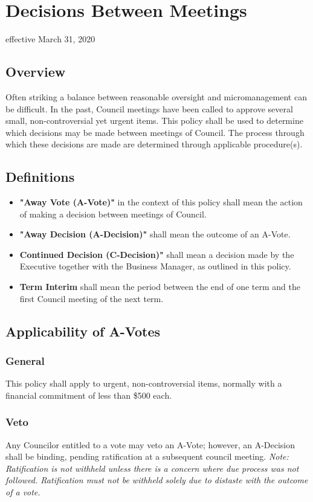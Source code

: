 \section{Decisions Between Meetings}
effective March 31, 2020

\subsection{Overview}
Often striking a balance between reasonable oversight and micromanagement can be difficult. In
the past, Council meetings have been called to approve several small, non-controversial yet 
urgent items.  This policy shall be used to determine which decisions may be made between 
meetings of Council.  The process through which these decisions are made are determined through applicable procedure(s).

\subsection{Definitions}
\begin{itemize}
    \item \textbf{"Away Vote (A-Vote)"} in the context of this policy shall mean the action of making a decision between meetings of Council. 
    \item \textbf{"Away Decision (A-Decision)"} shall mean the outcome of an A-Vote.
    \item \textbf{Continued Decision (C-Decision)"} shall mean a decision made by the Executive together with the Business Manager, as outlined in this policy. 
    \item \textbf{Term Interim} shall mean the period between the end of one term and the first Council meeting of the next term.
\end{itemize}

\subsection{Applicability of A-Votes}

\subsubsection{General}
This policy shall apply to urgent, non-controversial items, normally with a financial commitment 
of less than \$500 each.

\subsubsection{Veto}
Any Councilor entitled to a vote may veto an A-Vote; however, an A-Decision shall be binding, 
pending ratification at a subsequent council meeting.
\textit{Note: Ratification is not withheld unless there is a concern where due process was not 
followed. Ratification must not be withheld solely due to distaste with the outcome of a vote.}

